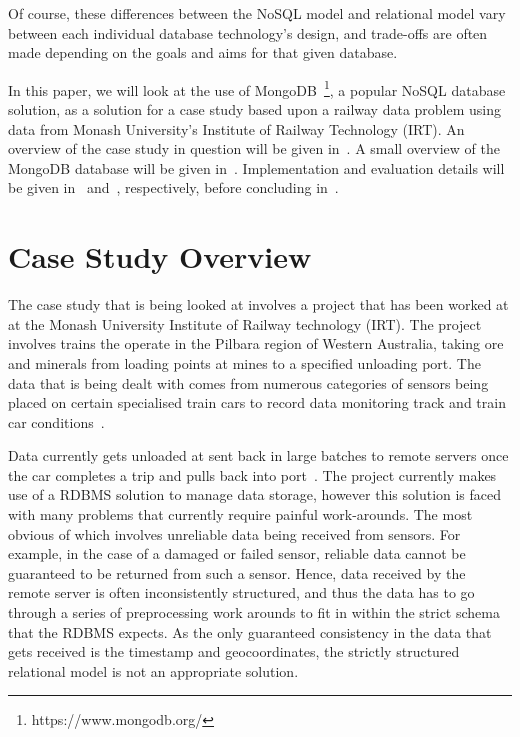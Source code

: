 \documentclass[a4paper,11pt]{article}
\begin{document}
Of course, these differences between the NoSQL model and relational model vary between each individual database
technology's design, and trade-offs are often made depending on the goals and aims for that given database.

In this paper, we will look at the use of MongoDB~\footnote{https://www.mongodb.org/}, a popular NoSQL database solution,
as a solution for a case study based upon a railway data problem using data from Monash University's Institute of Railway
Technology (IRT). An overview of the case study in question will be given in~. A small
overview of the MongoDB database will be given in~. Implementation and
evaluation details will be given in~ and~, respectively,
before concluding in~.


\newpage

\section{Case Study Overview} %
\label{sec:case_study_overview}

The case study that is being looked at involves a project that has been worked at at the Monash University Institute of
Railway technology (IRT). The project involves trains the operate in the Pilbara region of Western Australia, taking
ore and minerals from loading points at mines to a specified unloading port. The data that is being dealt with comes from
numerous categories of sensors being placed on certain specialised train cars to record data monitoring track and train
car conditions~\cite{darby2003development,darby2005track}.

Data currently gets unloaded at sent back in large batches to remote servers once the car completes a trip and pulls back
into port~\cite{thomas2012taking}. The project currently makes use of a RDBMS solution to manage data storage, however
this solution is faced with many problems that currently require painful work-arounds. The most obvious of which involves
unreliable data being received from sensors. For example, in the case of a damaged or failed sensor, reliable data cannot
be guaranteed to be returned from such a sensor. Hence, data received by the remote server is often inconsistently
structured, and thus the data has to go through a series of preprocessing work arounds to fit in within the strict
schema that the RDBMS expects. As the only guaranteed consistency in the data that gets received is the timestamp and
geocoordinates, the strictly structured relational model is not an appropriate solution.
\end{document}
